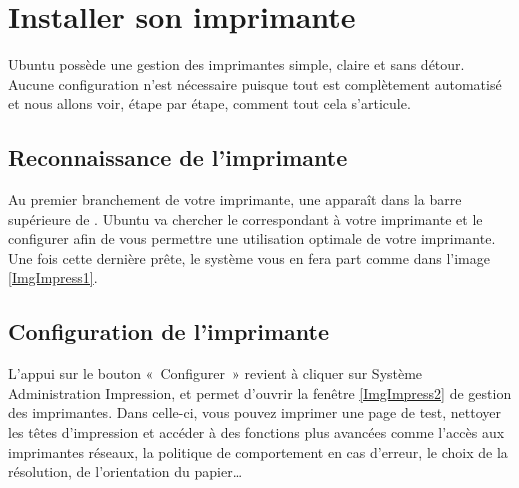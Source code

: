 \section{Installer son imprimante}
\label{RefInstallImprimante}
Ubuntu possède une gestion des imprimantes simple, claire et sans détour. Aucune configuration n'est nécessaire puisque tout est complètement automatisé et nous allons voir, étape par étape, comment tout cela s'articule. 
\subsection{Reconnaissance de l'imprimante}
Au premier branchement de votre imprimante, une  apparaît dans la barre supérieure de . Ubuntu va chercher le  correspondant à votre imprimante et le configurer afin de vous permettre une utilisation optimale de votre imprimante.
Une fois cette dernière prête, le système vous en fera part comme dans l'image \ref{ImgImpress1}.\par
{}
\subsection{Configuration de l'imprimante}
L'appui sur le bouton «~Configurer~» revient à cliquer sur Système \FlecheDroite Administration \FlecheDroite Impression, et permet d'ouvrir la fenêtre \ref{ImgImpress2} de gestion des imprimantes. Dans celle-ci, vous pouvez imprimer une page de test, nettoyer les têtes d'impression et accéder à des fonctions plus avancées comme l'accès aux imprimantes réseaux, la politique de comportement en cas d'erreur, le choix de la résolution, de l'orientation du papier\ldots{}\par
{}

